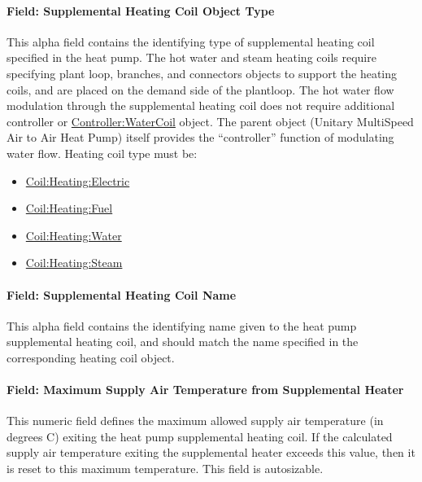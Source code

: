 \paragraph{Field: Supplemental Heating Coil Object Type}\label{field-supplemental-heating-coil-object-type-2}

This alpha field contains the identifying type of supplemental heating coil specified in the heat pump. The hot water and steam heating coils require specifying plant loop, branches, and connectors objects to support the heating coils, and are placed on the demand side of the plantloop. The hot water flow modulation through the supplemental heating coil does not require additional controller or \hyperref[controllerwatercoil]{Controller:WaterCoil} object. The parent object (Unitary MultiSpeed Air to Air Heat Pump) itself provides the ``controller'' function of modulating water flow. Heating coil type must be:

\begin{itemize}
\item
  \hyperref[coilheatingelectric]{Coil:Heating:Electric}
\item
  \hyperref[coilheatinggas-000]{Coil:Heating:Fuel}
\item
  \hyperref[coilheatingwater]{Coil:Heating:Water}
\item
  \hyperref[coilheatingsteam]{Coil:Heating:Steam}
\end{itemize}

\paragraph{Field: Supplemental Heating Coil Name}\label{field-supplemental-heating-coil-name-2}

This alpha field contains the identifying name given to the heat pump supplemental heating coil, and should match the name specified in the corresponding heating coil object.

\paragraph{Field: Maximum Supply Air Temperature from Supplemental Heater}\label{field-maximum-supply-air-temperature-from-supplemental-heater-1}

This numeric field defines the maximum allowed supply air temperature (in degrees C) exiting the heat pump supplemental heating coil. If the calculated supply air temperature exiting the supplemental heater exceeds this value, then it is reset to this maximum temperature. This field is autosizable.

